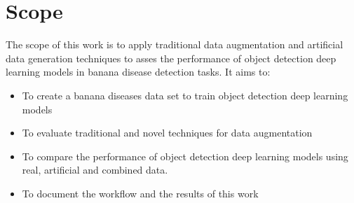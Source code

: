 \chapter{Scope} %
\label{Chapter3}

The scope of this work is to apply traditional data augmentation and artificial data generation techniques to asses the performance of object detection deep learning models in banana disease detection tasks. It aims to:

\begin{itemize}
\item To create a banana diseases data set to train object detection deep learning models 
\item To evaluate traditional and novel techniques for data augmentation 
\item To compare the performance of object detection deep learning models using real, artificial and combined data. 
\item To document the workflow and the results of this work    
\end{itemize}